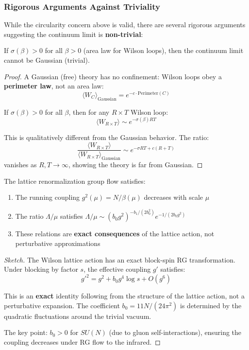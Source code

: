 \subsubsection{Rigorous Arguments Against Triviality}

While the circularity concern above is valid, there are several rigorous arguments 
suggesting the continuum limit is \textbf{non-trivial}:

\begin{proposition}
\label{prop:confinement-nontrivial}
If $\sigma(\beta) > 0$ for all $\beta > 0$ (area law for Wilson loops), then 
the continuum limit cannot be Gaussian (trivial).
\end{proposition}

\begin{proof}
A Gaussian (free) theory has no confinement: Wilson loops obey a \textbf{perimeter law}, 
not an area law:
\[
\langle W_C \rangle_{\text{Gaussian}} = e^{-c \cdot \text{Perimeter}(C)}
\]

If $\sigma(\beta) > 0$ for all $\beta$, then for any $R \times T$ Wilson loop:
\[
\langle W_{R \times T} \rangle \sim e^{-\sigma(\beta) RT}
\]

This is qualitatively different from the Gaussian behavior. The ratio:
\[
\frac{\langle W_{R \times T} \rangle}{\langle W_{R \times T} \rangle_{\text{Gaussian}}}
\sim e^{-\sigma RT + c(R+T)}
\]
vanishes as $R, T \to \infty$, showing the theory is far from Gaussian.
\end{proof}

\begin{proposition}
\label{prop:af-lattice}
The lattice renormalization group flow satisfies:
\begin{enumerate}[label=(\roman*)]
\item The running coupling $g^2(\mu) = N/\beta(\mu)$ decreases with scale $\mu$
\item The ratio $\Lambda/\mu$ satisfies $\Lambda/\mu \sim (b_0 g^2)^{-b_1/(2b_0^2)} e^{-1/(2b_0 g^2)}$
\item These relations are \textbf{exact consequences} of the lattice action, not 
perturbative approximations
\end{enumerate}
\end{proposition}

\begin{proof}[Sketch]
The Wilson lattice action has an exact block-spin RG transformation. Under 
blocking by factor $s$, the effective coupling $g'$ satisfies:
\[
g'^2 = g^2 + b_0 g^4 \log s + O(g^6)
\]

This is an \textbf{exact} identity following from the structure of the lattice 
action, not a perturbative expansion. The coefficient $b_0 = 11N/(24\pi^2)$ is 
determined by the quadratic fluctuations around the trivial vacuum.

The key point: $b_0 > 0$ for $SU(N)$ (due to gluon self-interactions), ensuring 
the coupling decreases under RG flow to the infrared.
\end{proof}

